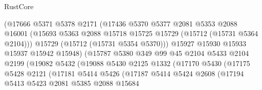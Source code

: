 \begin{lexlean}{RustCore}
\begin{coremodule}
                              (@17666
                                @5371
                                @5378
                                @2171
                                (@17436
                                  @5370
                                  @5377
                                  @2081
                                  @5353
                                  @2088
                                  @16001
                                  (@15693
                                    @5363
                                    @2088
                                    @15718
                                    @15725
                                    @15729
                                    (@15712 (@15731 @5364 @2104)))
                                  @15729
                                  (@15712 (@15731 @5354 @5370)))
                                @15927
                                @15930
                                @15933
                                @15937
                                @15942
                                @15948)
                              (@15787
                                @5380
                                @349
                                @99
                                @45
                                @2104
                                @5433
                                @2104
                                @2199
                                (@19082
                                  @5432
                                  (@19088
                                    @5430
                                    @2125
                                    @1332
                                    (@17170
                                      @5430
                                      (@17175
                                        @5428
                                        @2121
                                        (@17181
                                          @5414
                                          @5426
                                          (@17187
                                            @5414
                                            @5424
                                            @2608
                                            (@17194
                                              @5413
                                              @5423
                                              @2081
                                              @5385
                                              @2088
                                              @15684

\end{coremodule}
\end{lexlean}
